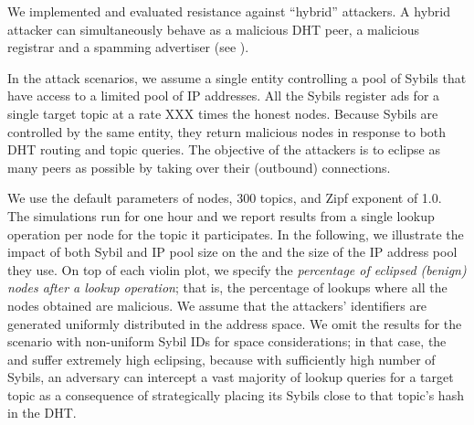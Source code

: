 

We implemented and evaluated \sysname resistance against ``hybrid'' attackers. A hybrid attacker can simultaneously behave as a malicious DHT peer, a malicious registrar and a spamming advertiser (see ). 

In the attack scenarios, we assume a single entity controlling a pool of Sybils that have access to a limited pool of IP addresses. All the Sybils register ads for a single target topic at a rate XXX times the honest nodes. Because Sybils are controlled by the same entity, they return malicious nodes in response to both DHT routing and topic queries. The objective of the attackers is to eclipse as many peers as possible by taking over their (outbound) connections.

We use the default parameters of  nodes, 300 topics, and Zipf exponent of 1.0.  The simulations run for one hour and we report results from a single lookup operation per node for the topic it participates. In the following, we illustrate the impact of both Sybil and IP pool size on the and the size of the IP address pool they use. On top of each violin plot, we specify the \emph{percentage of eclipsed (benign) nodes after a lookup operation}; that is, the percentage of lookups where all the nodes obtained are malicious. We assume that the attackers' identifiers are generated uniformly distributed in the address space. We omit the results for the scenario with non-uniform Sybil IDs for space considerations; in that case, the \altname and \altnameticket suffer extremely high eclipsing, because with sufficiently high number of Sybils, an adversary can intercept a vast majority of lookup queries for a target topic as a consequence of strategically placing its Sybils close to that topic's hash in the DHT.

